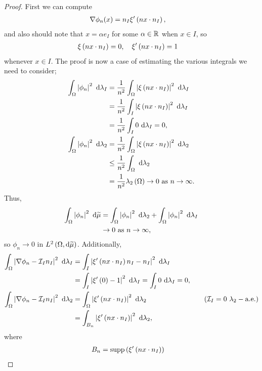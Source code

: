 \documentclass[11pt]{report}
\begin{document}
\begin{proof}
	First we can compute
	\begin{align*}
		\nabla\phi_n(x) &= n_I \xi'\left( n x\cdot n_I \right),
	\end{align*}
	and also should note that $x=\alpha e_I$ for some $\alpha\in\mathbb{R}$ when $x\in I$, so
	\begin{align*}
		\xi\left( nx\cdot n_I \right) &= 0, \quad \xi'\left( nx\cdot n_I \right) = 1
	\end{align*}
	whenever $x\in I$.
	The proof is now a case of estimating the various integrals we need to consider;
	\begin{align*}
		\int_{\Omega}\left\lvert \phi_n \right\rvert^2 \ \mathrm{d}\lambda_I
		&= \frac{1}{n^2}\int_{\Omega}\left\lvert \xi\left( nx\cdot n_I \right) \right\rvert^2 \ \mathrm{d}\lambda_I \\
		&= \frac{1}{n^2}\int_{I}\left\lvert \xi\left( nx\cdot n_I \right) \right\rvert^2 \ \mathrm{d}\lambda_I \\
		&= \frac{1}{n^2}\int_{I}0 \ \mathrm{d}\lambda_I = 0, \\
		\int_{\Omega}\left\lvert \phi_n \right\rvert^2 \ \mathrm{d}\lambda_2
		&= \frac{1}{n^2}\int_{\Omega}\left\lvert \xi\left( nx\cdot n_I \right) \right\rvert^2 \ \mathrm{d}\lambda_2 \\
		&\leq \frac{1}{n^2}\int_{\Omega} \ \mathrm{d}\lambda_2 \\
		&= \frac{1}{n^2}\lambda_2\left( \Omega \right) \rightarrow 0 \ \text{as} \ n \rightarrow\infty.
	\end{align*}
	Thus,
	\begin{align*}
		\int_{\Omega}\left\lvert \phi_n \right\rvert^2 \ \mathrm{d}\widetilde{\mu} &= \int_{\Omega}\left\lvert \phi_n \right\rvert^2 \ \mathrm{d}\lambda_2 + \int_{\Omega}\left\lvert \phi_n \right\rvert^2 \ \mathrm{d}\lambda_I \\
		&\rightarrow 0 \ \text{as} \ n \rightarrow\infty,
	\end{align*}
	so $\phi_n\rightarrow0$ in $L^{2}\left( \Omega,\mathrm{d}\widetilde{\mu} \right)$.
	Additionally,
	\begin{align*}
		\int_{\Omega}\left\lvert \nabla\phi_n - \mathcal{I}_{I}n_I \right\rvert^2 \ \mathrm{d}\lambda_I
		&= \int_{I}\left\lvert \xi'\left( nx\cdot n_I \right)n_I - n_I \right\rvert^2 \ \mathrm{d}\lambda_I \\
		&= \int_{I}\left\lvert \xi'\left( 0 \right) - 1 \right\rvert^2 \ \mathrm{d}\lambda_I
		= \int_{I}0 \ \mathrm{d}\lambda_I = 0, \\
		\int_{\Omega}\left\lvert \nabla\phi_n - \mathcal{I}_{I}n_I \right\rvert^2 \ \mathrm{d}\lambda_2
		&= \int_{\Omega}\left\lvert \xi'\left( nx\cdot n_I \right) \right\rvert^2 \ \mathrm{d}\lambda_2 &\quad(\mathcal{I}_{I}=0 \ \lambda_2-\text{a.e.}) \\
		&= \int_{B_n}\left\lvert \xi'\left( nx\cdot n_I \right) \right\rvert^2 \ \mathrm{d}\lambda_2,
	\end{align*}
	where
	\begin{align*}
		B_n &= \supp\bracs{\xi'\bracs{nx\cdot n_I}}

\end{align*}
\end{proof}
\end{document}
